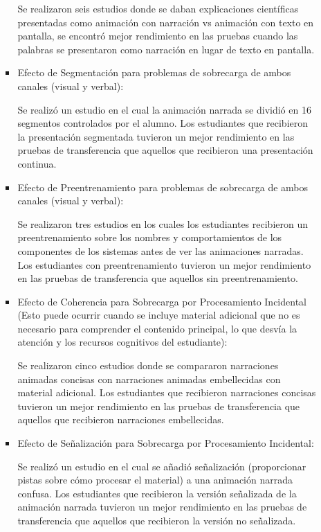 \begin{itemize}
\begin{itemize}
\begin{itemize}
             Se realizaron seis estudios donde se daban explicaciones científicas presentadas como animación con narración vs animación con texto en pantalla, se encontró mejor rendimiento en las pruebas cuando las palabras se presentaron como narración en lugar de texto en pantalla.
             
             \item Efecto de Segmentación para problemas de sobrecarga de ambos canales (visual y verbal):
             
             Se realizó un estudio en el cual la animación narrada se dividió en 16 segmentos controlados por el alumno. Los estudiantes que recibieron la presentación segmentada tuvieron un mejor rendimiento en las pruebas de transferencia que aquellos que recibieron una presentación continua.
            
             \item Efecto de Preentrenamiento para problemas de sobrecarga de ambos canales (visual y verbal):

             Se realizaron tres estudios en los cuales los estudiantes recibieron un preentrenamiento sobre los nombres y comportamientos de los componentes de los sistemas antes de ver las animaciones narradas.  Los estudiantes con preentrenamiento tuvieron un mejor rendimiento en las pruebas de transferencia que aquellos sin preentrenamiento.

             \item  Efecto de Coherencia para Sobrecarga por Procesamiento Incidental (Esto puede ocurrir cuando se incluye material adicional que no es necesario para comprender el contenido principal, lo que desvía la atención y los recursos cognitivos del estudiante):

             Se realizaron cinco estudios donde se compararon narraciones animadas concisas con narraciones animadas embellecidas con material adicional. Los estudiantes que recibieron narraciones concisas tuvieron un mejor rendimiento en las pruebas de transferencia que aquellos que recibieron narraciones embellecidas.

             \item Efecto de Señalización para Sobrecarga por Procesamiento Incidental: 

             Se realizó un estudio en el cual se añadió señalización (proporcionar pistas sobre cómo procesar el material) a una animación narrada confusa. Los estudiantes que recibieron la versión señalizada de la animación narrada tuvieron un mejor rendimiento en las pruebas de transferencia que aquellos que recibieron la versión no señalizada.


\end{itemize}
\end{itemize}
\end{itemize}
